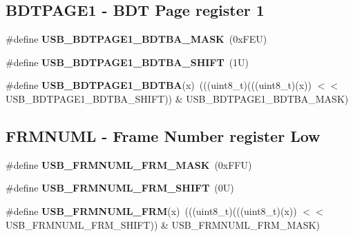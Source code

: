 \subsection*{B\+D\+T\+P\+A\+G\+E1 -\/ B\+DT Page register 1}
\begin{DoxyCompactItemize}
\item 
\mbox{\label{group___u_s_b___register___masks_gacd2b27fefcff6f79e930e76d2a1a7b26}} 
\#define {\bfseries U\+S\+B\+\_\+\+B\+D\+T\+P\+A\+G\+E1\+\_\+\+B\+D\+T\+B\+A\+\_\+\+M\+A\+SK}~(0x\+F\+E\+U)
\item 
\mbox{\label{group___u_s_b___register___masks_ga50c84ff08884c9825cf6c513f11aabe4}} 
\#define {\bfseries U\+S\+B\+\_\+\+B\+D\+T\+P\+A\+G\+E1\+\_\+\+B\+D\+T\+B\+A\+\_\+\+S\+H\+I\+FT}~(1\+U)
\item 
\mbox{\label{group___u_s_b___register___masks_gaab031dcfd0867133f1d23dd92ef695ad}} 
\#define {\bfseries U\+S\+B\+\_\+\+B\+D\+T\+P\+A\+G\+E1\+\_\+\+B\+D\+T\+BA}(x)~(((uint8\+\_\+t)(((uint8\+\_\+t)(x)) $<$$<$ U\+S\+B\+\_\+\+B\+D\+T\+P\+A\+G\+E1\+\_\+\+B\+D\+T\+B\+A\+\_\+\+S\+H\+I\+FT)) \& U\+S\+B\+\_\+\+B\+D\+T\+P\+A\+G\+E1\+\_\+\+B\+D\+T\+B\+A\+\_\+\+M\+A\+SK)
\end{DoxyCompactItemize}
\subsection*{F\+R\+M\+N\+U\+ML -\/ Frame Number register Low}
\begin{DoxyCompactItemize}
\item 
\mbox{\label{group___u_s_b___register___masks_ga197f6ef10431b69cb9b84fe7241a318a}} 
\#define {\bfseries U\+S\+B\+\_\+\+F\+R\+M\+N\+U\+M\+L\+\_\+\+F\+R\+M\+\_\+\+M\+A\+SK}~(0x\+F\+F\+U)
\item 
\mbox{\label{group___u_s_b___register___masks_ga723c2de82420db0c349049ad6f66ad14}} 
\#define {\bfseries U\+S\+B\+\_\+\+F\+R\+M\+N\+U\+M\+L\+\_\+\+F\+R\+M\+\_\+\+S\+H\+I\+FT}~(0\+U)
\item 
\mbox{\label{group___u_s_b___register___masks_gadd68274e4e3aa3763c3a5c36737188ff}} 
\#define {\bfseries U\+S\+B\+\_\+\+F\+R\+M\+N\+U\+M\+L\+\_\+\+F\+RM}(x)~(((uint8\+\_\+t)(((uint8\+\_\+t)(x)) $<$$<$ U\+S\+B\+\_\+\+F\+R\+M\+N\+U\+M\+L\+\_\+\+F\+R\+M\+\_\+\+S\+H\+I\+FT)) \& U\+S\+B\+\_\+\+F\+R\+M\+N\+U\+M\+L\+\_\+\+F\+R\+M\+\_\+\+M\+A\+SK)
\end{DoxyCompactItemize}
